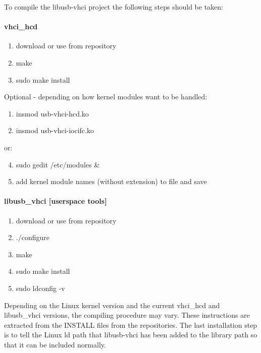 To compile the libusb-vhci project the following steps should be taken:

\paragraph{vhci\_hcd}

\begin{enumerate}
 \item download or use from repository
 \item make
 \item sudo make install
\end{enumerate}

Optional - depending on how kernel modules want to be handled:

\begin{enumerate}[resume]
 \item insmod usb-vhci-hcd.ko
 \item insmod usb-vhci-iocifc.ko
\end{enumerate}
 
or:
 
\begin{enumerate}
\setcounter{enumi}{3}
 \item sudo gedit /etc/modules \&
 \item add kernel module names (without extension) to file and save
\end{enumerate}

\paragraph{libusb\_vhci [userspace tools]}

\begin{enumerate}
 \item download or use from repository
 \item ./configure
 \item make
 \item sudo make install
 \item sudo ldconfig -v 
\end{enumerate}

Depending on the Linux kernel version and the current vhci\_hcd and libusb\_vhci versions, 
the compiling procedure may vary. These instructions are extracted from the INSTALL 
files from the repositories. The last installation step is to tell the Linux ld path that 
libusb-vhci has been added to the library path so that it can be included normally.

